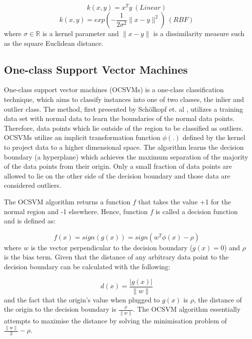 \documentclass{mpaper}
\begin{document}
\begin{equation}\label{eqn:linear}
    k(x,y) = x^Ty\ (Linear)
\end{equation}
\begin{equation}\label{eqn:rbf}
    k(x,y) = exp\left(-\frac{1}{2\sigma^2}\parallel x - y \parallel^2\right)\ (RBF)
\end{equation}
where $\sigma \in \mathbb{R}$ is a kernel parameter and $\parallel x - y\parallel$ is a dissimilarity measure such as the square Euclidean distance. 

\subsection{One-class Support Vector Machines}

One-class support vector machines (OCSVMs) is a one-class classification technique, which aims to classify instances into one of two classes, the inlier and outlier class. The method, first presented by Schölkopf et. al \cite{OriginalOCSVM},  utilizes a training data set with normal data to learn the boundaries of the normal data points. Therefore, data points which lie outside of the region to be classified as outliers. OCSVMs utilize an implicit transformation function $\phi\left(.\right)$ defined by the kernel to project data to a higher dimensional space. The algorithm learns the decision boundary (a hyperplane) which achieves the maximum separation of the majority of the data points from their origin. Only a small fraction of data points are allowed to lie on the other side of the decision boundary and those data are considered outliers. 

The OCSVM algorithm returns a function $f$ that takes the value +1 for the normal region and -1 elsewhere. Hence, function $f$ is called a decision function and is defined as:

\begin{equation}
    f(x) = sign(g(x)) = sign(w^T\phi(x) - \rho)
\end{equation}
where $w$ is the vector perpendicular to the decision boundary ($g(x) = 0 $) and $\rho$ is the bias term. 
Given that the distance of any arbitrary data point to the decision boundary can be calculated with the following:

\begin{equation}
    d(x) = \frac{|g(x)|}{\parallel w \parallel}
\end{equation}
and the fact that the origin's value when plugged to $g(x)$ is $\rho$, the distance of the origin to the decision boundary is $\frac{\rho}{\parallel w\parallel}$. The OCSVM algorithm essentially attempts to maximise the distance by solving the minimisation problem of $\frac{\parallel w \parallel}{2} - \rho$.
\end{document}
